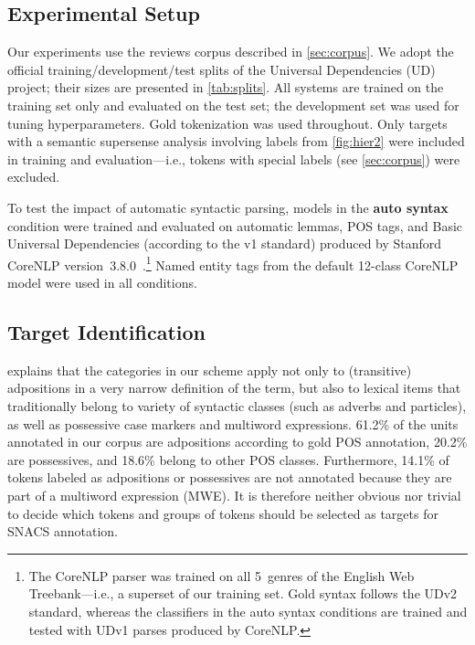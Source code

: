 \pdfoutput=1 \documentclass[11pt,a4paper]{article}
\begin{document}
\subsection{Experimental Setup}
\label{sec:experimental-setup}

Our experiments use the reviews corpus described in \cref{sec:corpus}. 
We adopt the official training\slash development\slash test splits of the Universal Dependencies (UD) project; their sizes are presented in \cref{tab:splits}.
All systems are trained on the training set only and evaluated on the test set; 
the development set was used for tuning hyperparameters.
Gold tokenization was used throughout. 
Only targets with a semantic supersense analysis involving labels from \cref{fig:hier2} were included 
in training and evaluation---i.e., tokens with special labels (see \cref{sec:corpus}) were excluded. 

To test the impact of automatic syntactic parsing, 
models in the \textbf{auto syntax} condition were trained and evaluated 
on automatic lemmas, POS tags, and Basic Universal Dependencies (according to the v1 standard) produced by Stanford CoreNLP version~3.8.0~\cite{manning2014stanford}.\footnote{The CoreNLP parser was trained on all 5~genres of the English Web Treebank---i.e., a superset of our training set. Gold syntax follows the UDv2 standard, whereas the classifiers in the auto syntax conditions are trained and tested with UDv1 parses produced by CoreNLP.} Named entity tags from the default 12-class CoreNLP model were used in all conditions.











\subsection{Target Identification}\label{sec:pss-id}


 explains that the categories in our scheme apply not only to (transitive) adpositions in a very narrow definition of the term, but also to lexical items that traditionally belong to variety of syntactic classes (such as adverbs and particles), as well as possessive case markers and multiword expressions. 61.2\% of the units annotated in our corpus are adpositions according to gold POS annotation, 20.2\% are possessives, and 18.6\% belong to other POS classes. Furthermore, 14.1\% of tokens labeled as adpositions or possessives are not annotated because they are part of a multiword expression (MWE). It is therefore neither obvious nor trivial to decide which tokens and groups of tokens should be selected as targets for SNACS annotation.
\end{document}
